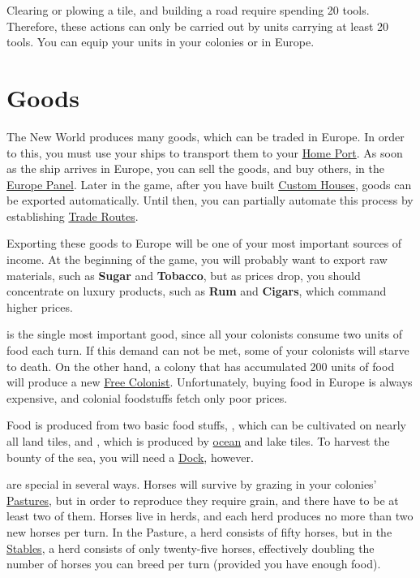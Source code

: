 \documentclass[12pt]{book}
\begin{document}
Clearing or plowing a tile, and building a road require spending 20
tools. Therefore, these actions can only be carried out by units
carrying at least 20 tools. You can equip your units in your colonies
or in Europe.

\hypertarget{Goods}{\section{Goods}}

The New World produces many goods, which can be traded in Europe. In
order to this, you must use your ships to transport them to your
\hyperlink{Home Port}{Home Port}. As soon as the ship arrives in
Europe, you can sell the goods, and buy others, in the
\hyperlink{europe panel}{Europe Panel}. Later in the game, after you
have built \hyperlink{Custom House}{Custom Houses}, goods can be
exported automatically. Until then, you can partially automate this
process by establishing \hyperlink{Trade Routes}{Trade Routes}.

Exporting these goods to Europe will be one of your most important
sources of income. At the beginning of the game, you will probably
want to export raw materials, such as \textbf{Sugar} and
\textbf{Tobacco}, but as prices drop, you should concentrate on luxury
products, such as \textbf{Rum} and \textbf{Cigars}, which command
higher prices.

 is the single most important good, since all your
colonists consume two units of food each turn. If this demand can not
be met, some of your colonists will starve to death.  On the other
hand, a colony that has accumulated 200 units of food will produce a
new \hyperlink{Free Colonist}{Free Colonist}. Unfortunately, buying
food in Europe is always expensive, and colonial foodstuffs fetch only
poor prices.

Food is produced from two basic food stuffs, , which can
be cultivated on nearly all land tiles, and , which is
produced by \hyperlink{Ocean}{ocean} and lake tiles. To harvest the
bounty of the sea, you will need a \hyperlink{Dock}{Dock}, however.

 are special in several ways. Horses will survive by
grazing in your colonies' \hyperlink{Pasture}{Pastures}, but in order
to reproduce they require grain, and there have to be at least two of
them. Horses live in herds, and each herd produces no more than two
new horses per turn. In the Pasture, a herd consists of fifty horses,
but in the \hyperlink{Stables}{Stables}, a herd consists of only
twenty-five horses, effectively doubling the number of horses you can
breed per turn (provided you have enough food).
\end{document}
